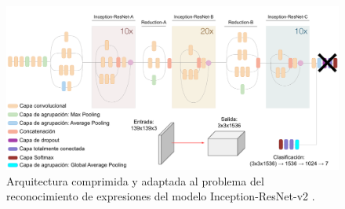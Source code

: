 \begin{figure}
    \centering
    \includegraphics[width=\textwidth]{Images/Inception-ResNet-v2.png}
    \caption{Arquitectura comprimida y adaptada al problema del reconocimiento de expresiones del modelo Inception-ResNet-v2 \cite{img:Inception-ResNet-v2}.}
    \label{fig:Inception-ResNet-v2}
\end{figure}

